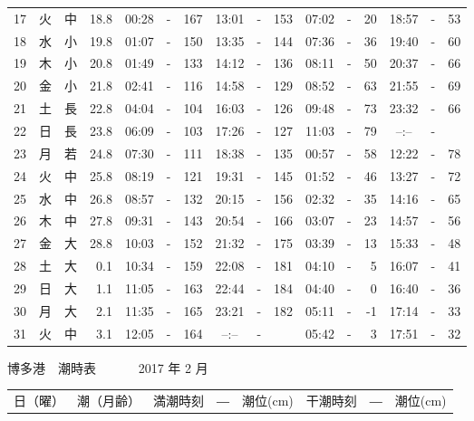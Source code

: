 \documentclass[12pt.a4j]{jsarticle}
\begin{document}
\begin{center}
\begin{table}[ht]
\begin{tabular}{|rc|cr|ccrccr|ccrccr|}
17 & 火 & 中 & 18.8 &  00:28 &-& 167  &  13:01 &-& 153  &   07:02 &-&  20  &   18:57 &-&  53  \\
18 & 水 & 小 & 19.8 &  01:07 &-& 150  &  13:35 &-& 144  &   07:36 &-&  36  &   19:40 &-&  60  \\
19 & 木 & 小 & 20.8 &  01:49 &-& 133  &  14:12 &-& 136  &   08:11 &-&  50  &   20:37 &-&  66  \\
20 & 金 & 小 & 21.8 &  02:41 &-& 116  &  14:58 &-& 129  &   08:52 &-&  63  &   21:55 &-&  69  \\
21 & 土 & 長 & 22.8 &  04:04 &-& 104  &  16:03 &-& 126  &   09:48 &-&  73  &   23:32 &-&  66  \\
22 & 日 & 長 & 23.8 &  06:09 &-& 103  &  17:26 &-& 127  &   11:03 &-&  79  &   --:-- &-&     \\
23 & 月 & 若 & 24.8 &  07:30 &-& 111  &  18:38 &-& 135  &   00:57 &-&  58  &   12:22 &-&  78  \\
24 & 火 & 中 & 25.8 &  08:19 &-& 121  &  19:31 &-& 145  &   01:52 &-&  46  &   13:27 &-&  72  \\
25 & 水 & 中 & 26.8 &  08:57 &-& 132  &  20:15 &-& 156  &   02:32 &-&  35  &   14:16 &-&  65  \\
26 & 木 & 中 & 27.8 &  09:31 &-& 143  &  20:54 &-& 166  &   03:07 &-&  23  &   14:57 &-&  56  \\
27 & 金 & 大 & 28.8 &  10:03 &-& 152  &  21:32 &-& 175  &   03:39 &-&  13  &   15:33 &-&  48  \\
28 & 土 & 大 &  0.1 &  10:34 &-& 159  &  22:08 &-& 181  &   04:10 &-&   5  &   16:07 &-&  41  \\
29 & 日 & 大 &  1.1 &  11:05 &-& 163  &  22:44 &-& 184  &   04:40 &-&   0  &   16:40 &-&  36  \\
30 & 月 & 大 &  2.1 &  11:35 &-& 165  &  23:21 &-& 182  &   05:11 &-&  -1  &   17:14 &-&  33  \\
31 & 火 & 中 &  3.1 &  12:05 &-& 164  &  --:-- &-&     &   05:42 &-&   3  &   17:51 &-&  32  \\
   \hline
   \end{tabular}
\end{table}
\newpage
 {\LARGE 博多港　潮時表　　　}
 {\large 2017 年  2 月}\\
 \begin{table}[ht]
    \begin{tabular}{|rc|cr|ccrccr|ccrccr|}
    \hline
    \multicolumn{2}{|c|}{日（曜）} & \multicolumn{2}{c|}{潮（月齢）} & \multicolumn{6}{c|}{満潮時刻　―　潮位(cm)} & \multicolumn{6}{c|}{干潮時刻　―　潮位(cm)} \\

\end{tabular}
\end{table}
\end{center}
\end{document}

